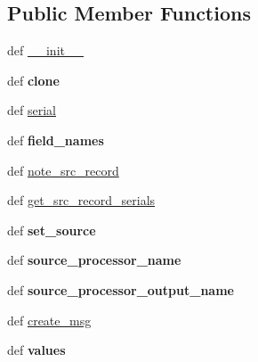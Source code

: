 \subsection*{Public Member Functions}
\begin{DoxyCompactItemize}
\item 
def \hyperlink{classetl_1_1EtlRecord_1_1EtlRecord_a682601780d0d927b8f9dc88e349de18a}{\-\_\-\-\_\-init\-\_\-\-\_\-}
\item 
\hypertarget{classetl_1_1EtlRecord_1_1EtlRecord_a8fe36664b70c30a7f59bd80f09d74e55}{def {\bfseries clone}}\label{classetl_1_1EtlRecord_1_1EtlRecord_a8fe36664b70c30a7f59bd80f09d74e55}

\item 
def \hyperlink{classetl_1_1EtlRecord_1_1EtlRecord_ab73174eafab6b09a253cdb0161f2c895}{serial}
\item 
\hypertarget{classetl_1_1EtlRecord_1_1EtlRecord_a8571d1a2070796be31b369899e514f8e}{def {\bfseries field\-\_\-names}}\label{classetl_1_1EtlRecord_1_1EtlRecord_a8571d1a2070796be31b369899e514f8e}

\item 
def \hyperlink{classetl_1_1EtlRecord_1_1EtlRecord_aada717afc26156c846346af596dcdbb8}{note\-\_\-src\-\_\-record}
\item 
def \hyperlink{classetl_1_1EtlRecord_1_1EtlRecord_a74cfb6726480592e4bc7b7781d82f764}{get\-\_\-src\-\_\-record\-\_\-serials}
\item 
\hypertarget{classetl_1_1EtlRecord_1_1EtlRecord_ab664b0f5cf2ba7abc2e2e31eabf88185}{def {\bfseries set\-\_\-source}}\label{classetl_1_1EtlRecord_1_1EtlRecord_ab664b0f5cf2ba7abc2e2e31eabf88185}

\item 
\hypertarget{classetl_1_1EtlRecord_1_1EtlRecord_ad04be283badfa4f93927d5ee2c028638}{def {\bfseries source\-\_\-processor\-\_\-name}}\label{classetl_1_1EtlRecord_1_1EtlRecord_ad04be283badfa4f93927d5ee2c028638}

\item 
\hypertarget{classetl_1_1EtlRecord_1_1EtlRecord_a11f6d425ebfcc1db3f147431311319ee}{def {\bfseries source\-\_\-processor\-\_\-output\-\_\-name}}\label{classetl_1_1EtlRecord_1_1EtlRecord_a11f6d425ebfcc1db3f147431311319ee}

\item 
def \hyperlink{classetl_1_1EtlRecord_1_1EtlRecord_ac572eae3d8884ccdf3bb3f7f0d6b2717}{create\-\_\-msg}
\item 
\hypertarget{classetl_1_1EtlRecord_1_1EtlRecord_a9b2d840c3032acf5c68d6378caab03c5}{def {\bfseries values}}\label{classetl_1_1EtlRecord_1_1EtlRecord_a9b2d840c3032acf5c68d6378caab03c5}


\end{DoxyCompactItemize}
